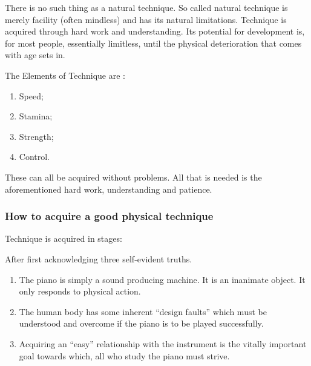 \documentclass{article}
\begin{document}
There is no such thing as a natural technique.
So called natural technique is merely facility (often mindless) and has its natural limitations.
Technique is acquired through hard work and understanding.
Its potential for development is, for most people, essentially limitless, until the physical deterioration that comes with age sets in.

The Elements of Technique are :
\begin{enumerate}
    \item Speed;
    \item Stamina;
    \item Strength;
    \item Control.
\end{enumerate}

These can all be acquired without problems.
All that is needed is the aforementioned hard work, understanding and patience.

\subsubsection{How to acquire a good physical technique}

Technique is acquired in stages:

After first acknowledging three self-evident truths.

\begin{enumerate}
    \item The piano is simply a sound producing machine.
        It is an inanimate object.
        It only responds to physical action.\footnotemark


    \item The human body has some inherent ``design faults'' which must be understood and overcome if the piano is to be played successfully.\footnotemark


    \item Acquiring an ``easy'' relationship with the instrument is the vitally important goal towards which, all who study the piano must strive.\footnotemark


\end{enumerate}
\end{document}

